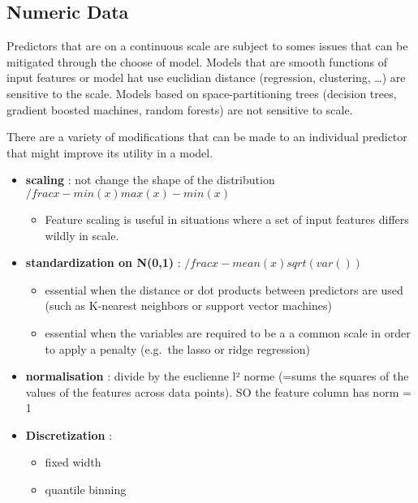 \documentclass[]{book}
\providecommand{\tightlist}{%
  \setlength{\itemsep}{0pt}\setlength{\parskip}{0pt}}
\theoremstyle{definition}
\theoremstyle{definition}
\theoremstyle{definition}
\theoremstyle{remark}
\begin{document}
\subsection{Numeric Data}\label{numeric-data}

Predictors that are on a continuous scale are subject to somes issues
that can be mitigated through the choose of model. Models that are
smooth functions of input features or model hat use euclidian distance
(regression, clustering, \ldots{}) are sensitive to the scale. Models
based on space-partitioning trees (decision trees, gradient boosted
machines, random forests) are not sensitive to scale.

There are a variety of modifications that can be made to an individual
predictor that might improve its utility in a model.

\begin{itemize}
\tightlist
\item
  \textbf{scaling} : not change the shape of the distribution
  \(/frac{x-min(x)}{max(x)-min(x)}\)

  \begin{itemize}
  \tightlist
  \item
    Feature scaling is useful in situations where a set of input
    features differs wildly in scale.
  \end{itemize}
\item
  \textbf{standardization on N(0,1)} : \(/frac{x-mean(x)}{sqrt(var())}\)

  \begin{itemize}
  \tightlist
  \item
    essential when the distance or dot products between predictors are
    used (such as K-nearest neighbors or support vector machines)
  \item
    essential when the variables are required to be a a common scale in
    order to apply a penalty (e.g.~the lasso or ridge regression)
  \end{itemize}
\item
  \textbf{normalisation} : divide by the euclienne l² norme (=sums the
  squares of the values of the features across data points). SO the
  feature column has norm = 1
\item
  \textbf{Discretization} :

  \begin{itemize}
  \tightlist
  \item
    fixed width
  \item
    quantile binning
  \end{itemize}
\end{itemize}
\end{document}
